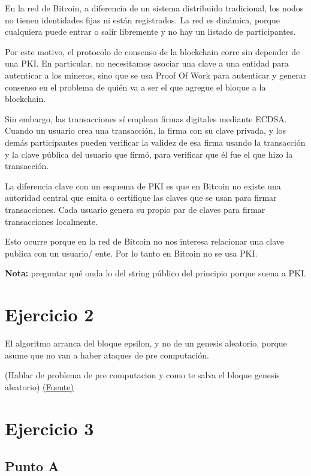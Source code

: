 \documentclass[12pt]{article}
\begin{document}
En la red de Bitcoin, a diferencia de un sistema distribuido tradicional, los nodos no tienen identidades fijas ni están registrados. La red es dinámica, porque cualquiera puede entrar o salir libremente y no hay un listado de participantes.  

Por este motivo, el protocolo de consenso de la blockchain corre sin depender de una PKI. En particular, no necesitamos asociar una clave a una entidad para autenticar a los mineros, sino que se usa Proof Of Work para autenticar y generar consenso en el problema de quién va a ser el que agregue el bloque a la blockchain.  

Sin embargo, las transacciones sí emplean firmas digitales mediante ECDSA. Cuando un usuario crea una transacción, la firma con su clave privada, y los demás participantes pueden verificar la validez de esa firma usando la transacción y la clave pública del usuario que firmó, para verificar que él fue el que hizo la transacción.  

La diferencia clave con un esquema de PKI es que en Bitcoin no existe una autoridad central que emita o certifique las claves que se usan para firmar transacciones. Cada usuario genera su propio par de claves para firmar transacciones localmente.

Esto ocurre porque en la red de Bitcoin no nos interesa relacionar una clave publica con un usuario/ ente. Por lo tanto en Bitcoin no se usa PKI. 

\textbf{Nota:} preguntar qué onda lo del string público del principio porque suena a PKI.  

\section*{Ejercicio 2}

El algoritmo arranca del bloque epsilon, y no de un genesis aleatorio, porque asume que no van a haber ataques de pre computación. 

(Hablar de problema de pre computacion y como te salva el bloque genesis aleatorio)
\href{https://dl.acm.org/doi/10.1145/3653445#fn13}{(Fuente)}
\section*{Ejercicio 3}

\subsection*{Punto A}
\end{document}
